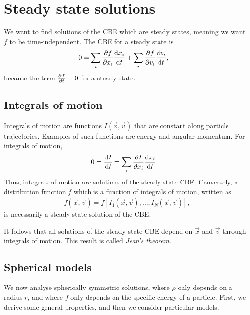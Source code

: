 
\section{Steady state solutions}

We want to find solutions of the CBE which are steady states, meaning we want $f$ to be time-independent. The CBE for a steady state is
\begin{align*}
	0
	&= \sum_{i} \pdv{f}{x_i} \dv{x_i}{t}
	+ \sum_{i} \pdv{f}{v_i} \dv{v_i}{t},
\end{align*}
because the term $\pdv{f}{t} = 0$ for a steady state.

\subsection{Integrals of motion}
Integrals of motion are functions $I(\vec{x}, \vec{v})$ that are constant along particle trajectories.
Examples of such functions are energy and angular momentum.
For integrals of motion,
\begin{align*}
	0 &= \dv{I}{t}
	= \sum_{i} \pdv{I}{x_i} \dv{x_i}{t}
\end{align*}
Thus, integrals of motion are solutions of the steady-state CBE.
Conversely, a distribution function $f$ which is a function of integrals of motion, written as
\begin{align*}
	f(\vec{x}, \vec{v}) = f[I_1(\vec{x}, \vec{v}), \dots, I_N(\vec{x}, \vec{v})],
\end{align*}
is necessarily a steady-state solution of the CBE.

It follows that all solutions of the steady state CBE depend on $\vec{x}$ and $\vec{v}$ through integrals of motion. This result is called \emph{Jean's theorem}.

\subsection{Spherical models}
\label{ssec:spherical-models}
We now analyse spherically symmetric solutions, where $\rho$ only depends on a radius $r$, and where $f$ only depends on the specific energy of a particle.
First, we derive some general properties, and then we consider particular models.

